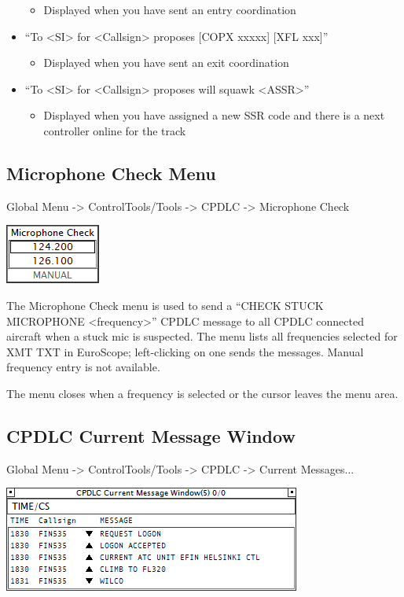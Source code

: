 \documentclass[11pt,a4paper]{memoir}
\begin{document}
\begin{itemize}
        \begin{itemize}
             \item Displayed when you have sent an entry coordination
        \end{itemize}
    \item“To <SI> for <Callsign> proposes [COPX xxxxx] [XFL xxx]”
        \begin{itemize}
             \item Displayed when you have sent an exit coordination
        \end{itemize}
    \item“To <SI> for <Callsign> proposes will squawk <ASSR>”
        \begin{itemize}
             \item Displayed when you have assigned a new SSR code and there is a next controller online for the track
        \end{itemize}
\end{itemize}
    
\subsection{Microphone Check Menu}
\label{menu:dlmcm}

Global Menu -> ControlTools/Tools -> CPDLC -> Microphone Check

\includegraphics{img/dlmicchk.png}

The Microphone Check menu is used to send a “CHECK STUCK MICROPHONE <frequency>” CPDLC message to all CPDLC connected aircraft when a stuck mic is suspected. The menu lists all frequencies selected for XMT TXT in EuroScope; left-clicking on one sends the messages. Manual frequency entry is not available.

The menu closes when a frequency is selected or the cursor leaves the menu area.

\subsection{CPDLC Current Message Window}
\label{win:dlcmw}

Global Menu -> ControlTools/Tools -> CPDLC -> Current Messages...

\includegraphics{img/dlcmw.png}
\end{document}
